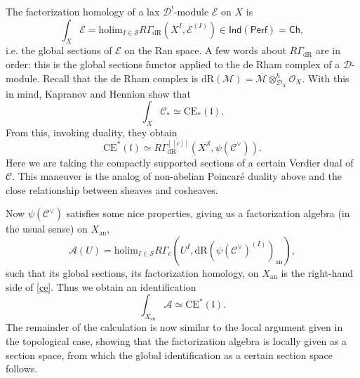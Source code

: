 \documentclass{amsart}
\theoremstyle{definition}
\newcommand{\holim}{\text{holim}}
\begin{document}
The factorization homology of a lax $\mathcal{D}^!$-module $\mathcal{E}$ on $X$ 
is
\begin{equation*}
    \int_X \mathcal{E} = \holim_{I\in\mathcal{S}}
    R\Gamma_{\text{dR}}(X^I, \mathcal{E}^{(I)}) \in 
    \mathsf{Ind}(\mathsf{Perf})=\mathsf{Ch},
\end{equation*}
i.e. the global sections of $\mathcal{E}$ on the Ran space. A few words about 
$R\Gamma_{\text{dR}}$ are in order: this is the global sections functor applied 
to the de Rham complex of a $\mathcal{D}$-module. Recall that the de Rham 
complex is $\text{dR}(\mathcal{M})=\mathcal{M} 
\otimes^h_{\mathcal{D}_X}\mathcal{O}_X$. With this in mind, Kapranov and Hennion 
show that
\begin{equation*}
    \int_X \mathcal{C}_* \simeq \text{CE}_*(\mathfrak{l}).
\end{equation*}
From this, invoking duality, they obtain
\begin{equation}
    \text{CE}^*(\mathfrak{l}) \simeq 
    R\Gamma_{\text{dR}}^{[[c]]}(X^{\mathcal{S}}, \psi(\mathcal{C}^\vee)).
    \label{ce}
\end{equation}
Here we are taking the compactly supported sections of a certain Verdier dual of 
$\mathcal{C}$. This maneuver is the analog of non-abelian Poincar\'e duality 
above and the close relationship between sheaves and cosheaves.

Now $\psi(\mathcal{C}^\vee)$ satisfies some nice properties, giving us 
a factorization algebra (in the usual sense) on $X_{\text{an}}$,
\begin{equation*}
    \mathcal{A}(U) = \holim_{I\in\mathcal{S}} R\Gamma_c(U^I, 
    \text{dR}(\psi(\mathcal{C}^\vee)^{(I)})_{\text{an}}),
\end{equation*}
such that its global sections, its factorization homology, on $X_\text{an}$ is 
the right-hand side of \ref{ce}. Thus we obtain an identification
\begin{equation*}
    \int_{X_\text{an}} \mathcal{A} \simeq \text{CE}^*(\mathfrak{l}).
\end{equation*}
The remainder of the calculation is now similar to the local argument given in 
the topological case, showing that the factorization algebra is locally given as 
a section space, from which the global identification as a certain section space 
follows.
\end{document}
